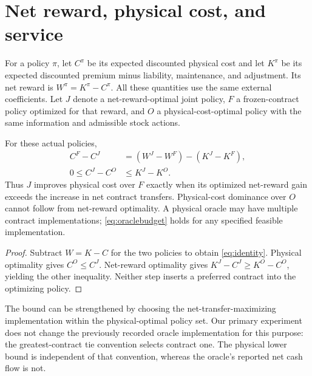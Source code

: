 \section{Net reward, physical cost, and service}\label{sec:physical}
For a policy $\pi$, let $C^\pi$ be its expected discounted physical cost and let $K^\pi$ be its expected discounted premium minus liability, maintenance, and adjustment. Its net reward is $W^\pi=K^\pi-C^\pi$. All these quantities use the same external coefficients. Let $J$ denote a net-reward-optimal joint policy, $F$ a frozen-contract policy optimized for that reward, and $O$ a physical-cost-optimal policy with the same information and admissible stock actions.

\begin{theorem}\label{thm:physical}
For these actual policies,
\begin{align}
 C^F-C^J&=(W^J-W^F)-(K^J-K^F),\label{eq:identity}\\
 0\leq C^J-C^O&\leq K^J-K^O.\label{eq:oraclebudget}
\end{align}
Thus $J$ improves physical cost over $F$ exactly when its optimized net-reward gain exceeds the increase in net contract transfers. Physical-cost dominance over $O$ cannot follow from net-reward optimality. A physical oracle may have multiple contract implementations; \eqref{eq:oraclebudget} holds for any specified feasible implementation.
\end{theorem}
\begin{proof}
Subtract $W=K-C$ for the two policies to obtain \eqref{eq:identity}. Physical optimality gives $C^O\leq C^J$. Net-reward optimality gives $K^J-C^J\geq K^O-C^O$, yielding the other inequality. Neither step inserts a preferred contract into the optimizing policy.\end{proof}

The bound can be strengthened by choosing the net-transfer-maximizing implementation within the physical-optimal policy set. Our primary experiment does not change the previously recorded oracle implementation for this purpose: the greatest-contract tie convention selects contract one. The physical lower bound is independent of that convention, whereas the oracle's reported net cash flow is not.


